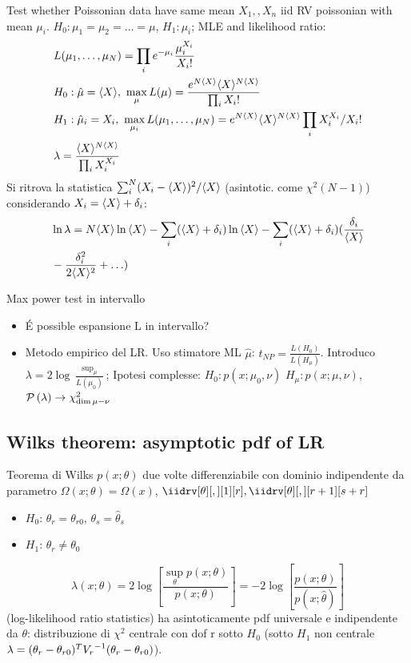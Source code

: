 \documentclass[asd-beamer.tex]{subfiles}
\begin{document}
\begin{wordonframe}{Test whether Poissonian data have same mean}
$X_1,,X_n$ iid RV poissonian with mean $\mu_i$. $H_0: \mu_1=\mu_2=\ldots=\mu$, $H_1: \mu_i$; MLE and likelihood ratio:
\begin{align*}
&L(\mu_1,\ldots,\mu_N)=\prod_i\exp{-\mu_i}\frac{\mu_i^{X_i}}{X_i!}\\
&H_0: \hat{\mu}=\exv{X},\ \max_{\mu}L(\mu)=\frac{\exp{N\exv{X}}\exv{X}\expy{N\exv{X}}}{\prod_iX_i!}\\
&H_1: \hat{\mu}_i=X_i,\ \max_{\mu_i}L(\mu_1,\ldots,\mu_N)=\exp{N\exv{X}}\exv{X}\expy{N\exv{X}}\prod_iX_i\expy{X_i}/X_i!\\
&\lambda=\frac{\exv{X}\expy{N\exv{X}}}{\prod_iX_i\expy{X_i}}
\end{align*}
Si ritrova la statistica $\sum_i^N(X_i-\langle X \rangle)^2/\langle X \rangle$ (asintotic. come $\chi^2(N-1)$) considerando $X_i=\langle X \rangle+\delta_i$:
\begin{align*}
&\ln{\lambda}=N\langle X \rangle\ln{\langle X \rangle}-\sum_i(\langle X \rangle+\delta_i)\ln{\langle X \rangle}-\sum_i(\langle X \rangle+\delta_i)(\frac{\delta_i}{\langle X \rangle}\\
&-\frac{\delta_i^2}{2\langle X \rangle^2}+\ldots)
\end{align*}
\end{wordonframe}

\begin{wordonframe}{Max power test in intervallo}
\begin{itemize}
\item \'E possible espansione L in intervallo?
\item Metodo empirico del LR. Uso stimatore ML $\hat{\mu}$: $t_{NP}=\frac{L(H_0)}{L(H_{\mu})}$. Introduco $\lambda=2\log{\frac{\sup_{\mu}}{L(\mu_0)}}$; Ipotesi complesse: $H_0: p(x;\mu_0,\nu)$ $H_{\mu}: p(x;\mu,\nu)$, $\operatorname{\mathcal{P}}{(\lambda)}\to \chi^2_{\dim{\mu-\nu}}$
\end{itemize}
\end{wordonframe}

\subsection{Wilks theorem: asymptotic pdf of LR}

\begin{frame}{Teorema di Wilks}\frameintoc
	$p(x;\theta)$ due volte differenziabile con dominio indipendente da parametro $\Omega(x;\theta)=\Omega(x)$, $\iidrv[\theta][,][1][r],\iidrv[\theta][,][r+1][s+r]$
	\begin{itemize}
		\item $H_0$: $\theta_r=\theta_{r0}$, $\theta_s=\hat{\theta}_s$
		\item $H_1$: $\theta_r\neq\theta_0$
	\end{itemize}
	\[\lambda(x;\theta)=2\log{[\frac{\sup_{\theta}{p(x;\theta)}}{p(x;\theta)}]}=-2\log{[\frac{p(x;\theta)}{p(x;\hat{\theta})}]}\] (log-likelihood ratio statistics) ha asintoticamente pdf universale e indipendente da $\theta$: distribuzione di $\chi^2$ centrale con dof r sotto $H_0$ (sotto $H_1$ non centrale $\lambda=(\theta_r-\theta_{r0})^T{V_r}^{-1}(\theta_r-\theta_{r0})$).
\end{frame}
\end{document}
